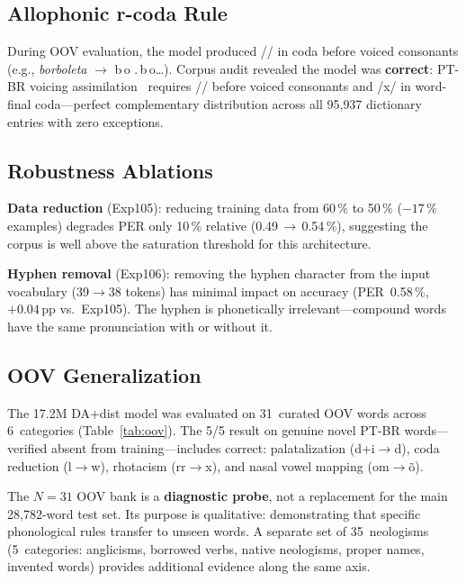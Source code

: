 \documentclass[conference]{IEEEtran}
\begin{document}
\subsection{Allophonic r-coda Rule}

During OOV evaluation, the model produced // in coda
before voiced consonants (e.g., \textit{borboleta} $\to$
b\,o\,\,.\,b\,o\ldots).
Corpus audit revealed the model was \textbf{correct}:
PT-BR voicing assimilation~\cite{barbosa2004brazilian} requires
// before voiced consonants and /x/ in word-final
coda---perfect complementary distribution across all 95{,}937
dictionary entries with zero exceptions.

\subsection{Robustness Ablations}

\textbf{Data reduction} (Exp105): reducing training data from
60\,\% to 50\,\% ($-17$\,\% examples) degrades PER only 10\,\%
relative (0.49\,$\to$\,0.54\,\%), suggesting the corpus is well
above the saturation threshold for this architecture.

\textbf{Hyphen removal} (Exp106): removing the hyphen character
from the input vocabulary (39$\to$38 tokens) has minimal impact
on accuracy (PER~0.58\,\%, $+0.04$\,pp vs.\ Exp105).
The hyphen is phonetically irrelevant---compound words have the
same pronunciation with or without it.

\subsection{OOV Generalization}
\label{sec:oov}

The 17.2M DA+dist model was evaluated on 31~curated OOV words across
6~categories (Table~\ref{tab:oov}).
The 5/5 result on genuine novel PT-BR words---verified absent from
training---includes correct: palatalization (d+i$\to$d),
coda reduction (l$\to$w), rhotacism (rr$\to$x), and nasal vowel
mapping (om$\to$\~{o}).

The $N\!=\!31$ OOV bank is a \textbf{diagnostic probe}, not a
replacement for the main 28{,}782-word test set.
Its purpose is qualitative: demonstrating that specific phonological
rules transfer to unseen words.
A separate set of 35~neologisms (5~categories: anglicisms,
borrowed verbs, native neologisms, proper names, invented words)
provides additional evidence along the same axis.
\end{document}
